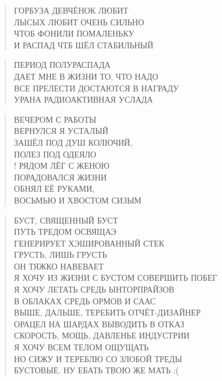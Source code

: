 \poemtitle{***}
\begin{verse}
ГОРБУЗА ДЕВЧЁНОК ЛЮБИТ\\
ЛЫСЫХ ЛЮБИТ ОЧЕНЬ СИЛЬНО\\
ЧТОБ ФОНИЛИ ПОМАЛЕНЬКУ\\
И РАСПАД ЧТБ ШЁЛ СТАБИЛЬНЫЙ
\end{verse}

\poemtitle{***}
\begin{verse}
ПЕРИОД ПОЛУРАСПАДА\\
ДАЕТ МНЕ В ЖИЗНИ ТО, ЧТО НАДО\\
ВСЕ ПРЕЛЕСТИ ДОСТАЮТСЯ В НАГРАДУ\\
УРАНА РАДИОАКТИВНАЯ УСЛАДА
\end{verse}

\poemtitle{***}
\begin{verse}
ВЕЧЕРОМ С РАБОТЫ \\
ВЕРНУЛСЯ Я УСТАЛЫЙ\\
ЗАШЁЛ  ПОД ДУШ КОЛЮЧИЙ, \\
ПОЛЕЗ ПОД ОДЕЯЛО\\!
РЯДОМ ЛЁГ С ЖЕНОЮ\\
ПОРАДОВАЛСЯ ЖИЗНИ\\
ОБНЯЛ ЕЁ РУКАМИ,\\
ВОСЬМЬЮ И ХВОСТОМ СИЗЫМ
\end{verse}

\poemtitle{***}
\begin{verse}
БУСТ, СВЯЩЕННЫЙ БУСТ\\
ПУТЬ ТРЕДОМ ОСВЯЩАЭ\\
ГЕНЕРИРУЕТ ХЭШИРОВАННЫЙ СТЕК\\
ГРУСТЬ, ЛИШЬ ГРУСТЬ\\
ОН ТЯЖКО НАВЕВАЕТ\\
Я ХОЧУ ИЗ ЖИЗНИ С БУСТОМ СОВЕРШИТЬ ПОБЕГ\\
Я ХОЧУ ЛЕТАТЬ СРЕДЬ ЫНТОРПРАЙЗОВ\\
В ОБЛАКАХ СРЕДЬ ОРМОВ И СААС\\
ВЫШЕ, ДАЛЬШЕ, ТЕРЕБИТЬ ОТЧЁТ-ДИЗАЙНЕР\\
ОРАЦЕЛ НА ШАРДАХ ВЫВОДИТЬ В ОТКАЗ\\
СКОРОСТЬ, МОЩЬ, ДАВЛЕНЬЕ ИНДУСТРИИ\\
Я ХОЧУ ВСЕМ ТЕЛОМ ОЩУЩАТЬ\\
НО СИЖУ И ТЕРЕБЛЮ СО ЗЛОБОЙ ТРЕДЫ\\
БУСТОВЫЕ. НУ ЕБАТЬ ТВОЮ ЖЕ МАТЬ :(
\end{verse}

